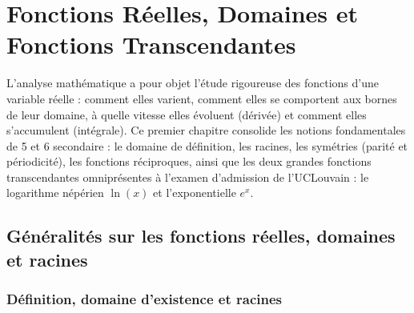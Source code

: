 \chapter{Fonctions Réelles, Domaines et Fonctions Transcendantes}

L'analyse mathématique a pour objet l'étude rigoureuse des fonctions d'une variable réelle : comment elles varient, comment elles se comportent aux bornes de leur domaine, à quelle vitesse elles évoluent (dérivée) et comment elles s'accumulent (intégrale). Ce premier chapitre consolide les notions fondamentales de 5\ieme{} et 6\ieme{} secondaire : le domaine de définition, les racines, les symétries (parité et périodicité), les fonctions réciproques, ainsi que les deux grandes fonctions transcendantes omniprésentes à l'examen d'admission de l'UCLouvain : le logarithme népérien $\ln(x)$ et l'exponentielle $e^x$.

\section{Généralités sur les fonctions réelles, domaines et racines}

\subsection{Définition, domaine d'existence et racines}

